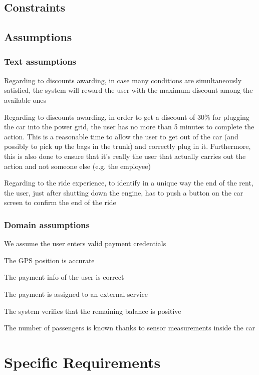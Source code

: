 \documentclass[11pt,a4paper]{report}
\begin{document}
\section{Constraints}
\section{Assumptions}
\subsection{Text assumptions}
\begin{TA}
	\item Regarding to discounts awarding, in case many conditions are simultaneously satisfied, the system will reward the user with the maximum discount among the available ones
	\item Regarding to discounts awarding, in order to get a discount of 30\% for plugging the car into the power grid, the user has no more than 5 minutes to complete the action. This is a reasonable time to allow the user to get out of the car (and possibly to pick up the bags in the trunk) and correctly plug in it. Furthermore, this is also done to ensure that it's really the user that actually carries out the action and not someone else (e.g. the employee)
	\item Regarding to the ride experience, to identify in a unique way the end of the rent, the user, just after shutting down the engine, has to push a button on the car screen to confirm the end of the ride
\end{TA}
\subsection{Domain assumptions}
\begin{DA}
	\item We assume the user enters valid payment credentials
	\item The GPS position is accurate
	\item The payment info of the user is correct
	\item The payment is assigned to an external service
	\item The system verifies that the remaining balance is positive
	\item The number of passengers is known thanks to sensor measurements inside the car
\end{DA}
\chapter{Specific Requirements}
\end{document}
